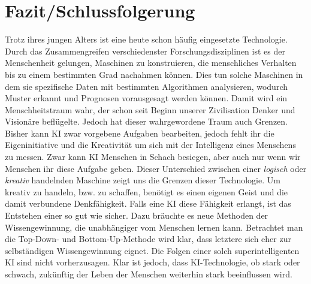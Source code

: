 \documentclass[12pt,german,ngerman]{report}
\begin{document}
%
%            

\chapter{Fazit/Schlussfolgerung}
    Trotz ihres jungen Alters ist  eine heute schon häufig eingesetzte Technologie.
    Durch das Zusammengreifen verschiedenster Forschungsdisziplinen ist es der Menschenheit gelungen,
    Maschinen zu konstruieren, die menschliches Verhalten bis zu einem bestimmten Grad nachahmen können.
    Dies tun solche Maschinen in dem sie spezifische Daten mit bestimmten Algorithmen analysieren, wodurch Muster erkannt und Prognosen vorausgesagt werden können.
    Damit wird ein Menschheitstraum wahr, der schon seit Beginn unserer Zivilisation Denker und Visionäre beflügelte.
    Jedoch hat dieser wahrgewordene Traum auch Grenzen. Bisher kann KI zwar vorgebene Aufgaben bearbeiten,
    jedoch fehlt ihr die Eigeninitiative und die Kreativität um sich mit der Intelligenz eines Menschens zu messen.
    Zwar kann KI Menschen in Schach besiegen, aber auch nur wenn wir Menschen ihr diese Aufgabe geben.
    Dieser Unterschied zwischen einer \emph{logisch} oder \emph{kreativ} handelnden Maschine
    zeigt uns die Grenzen dieser Technologie.
    Um kreativ zu handeln, bzw. zu schaffen, benötigt es einen eigenen Geist und die damit verbundene Denkfähigkeit.
    Falls eine KI diese Fähigkeit erlangt, ist das Entstehen einer  so gut wie sicher.
    Dazu bräuchte es neue Methoden der Wissengewinnung, die unabhängiger vom Menschen lernen kann.
    Betrachtet man die Top-Down- und Bottom-Up-Methode wird klar, dass letztere sich eher zur selbständigen Wissengewinnung eignet.
    Die Folgen einer solch superintelligenten KI sind nicht vorherzusagen.
    Klar ist jedoch, dass KI-Technologie, ob stark oder schwach, zukünftig der Leben der Menschen weiterhin stark beeinflussen wird.

    \printbibliography[title={Quellenverzeichnis}]
\end{document}
